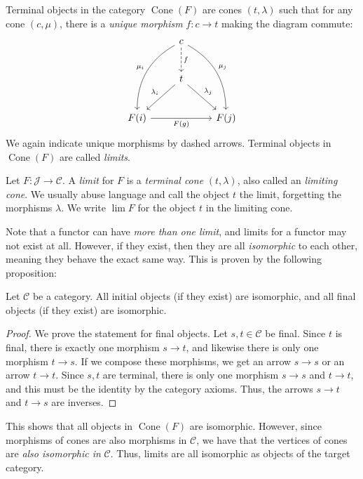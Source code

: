\documentclass[11pt, A4]{article}
\begin{document}
Terminal objects in the category $\operatorname{Cone} (F)$ are cones $(t,\lambda )$ such that for any cone $(c,\mu )$, there is a \emph{unique morphism} $f : c \to t$ making the diagram commute:
	\[\begin{tikzcd}[row sep = 2.5em, column sep = 2.5em]
	 & c \ar[" f ", dashed, d] \ar[" \mu_j ", bend left, ddr] \ar[" \mu _i "', bend right, ddl]  &  \\
	 & t \ar[" \lambda _j ", dr] \ar[" \lambda _i "', dl]  &  \\
	F(i)\ar[" F(g) "', rr]  &  & F(j)
	\end{tikzcd}\]
	We again indicate unique morphisms by dashed arrows. Terminal objects in $\operatorname{Cone} (F)$ are called \emph{limits}.

	\begin{definition}\label{4.5}
		Let $F : \mathcal{J}  \to \mathcal{C} $. A \emph{limit} for $F$ is a \emph{terminal cone} $(t,\lambda )$, also called an \emph{limiting cone}. We usually abuse language and call the object $t$ the limit, forgetting the morphisms $\lambda $. We write $\lim F$ for the object $t$ in the limiting cone.
	\end{definition}

	Note that a functor can have \emph{more than one limit}, and limits for a functor may not exist at all. However, if they exist, then they are all \emph{isomorphic} to each other, meaning they behave the exact same way. This is proven by the following proposition:
	\begin{proposition}\label{4.6}
		Let $\mathcal{C} $ be a category. All initial objects (if they exist) are isomorphic, and all final objects (if they exist) are isomorphic.
	\end{proposition}
	\begin{proof}
		We prove the statement for final objects. Let $s,t\in \mathcal{C} $ be final. Since $t$ is final, there is exactly one morphism $s\to t$, and likewise there is only one morphism $t\to s$. If we compose these morphisms, we get an arrow $s\to s$ or an arrow $t\to t$. Since $s,t$ are terminal, there is only one morphism $s\to s$ and $t\to t$, and this must be the identity by the category axioms. Thus, the arrows $s\to t$ and $t\to s$ are inverses.
	\end{proof}
	
	This shows that all objects in $\operatorname{Cone} (F)$ are isomorphic. However, since morphisms of cones are also morphisms in $\mathcal{C}$, we have that the vertices of cones are \emph{also isomorphic in} $\mathcal{C} $. Thus, limits are all isomorphic as objects of the target category.
\end{document}
